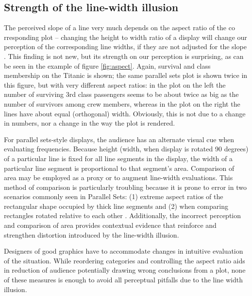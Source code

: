 \subsection{Strength of the line-width illusion}\label{distortion}


The perceived slope of a line very much depends on the aspect ratio of the co
rresponding plot -- changing the height to width ratio of a display  will change our perception of the corresponding line widths, if they are not adjusted for the slope \cite{cleveland:1984}. This finding is not new, but its strength on our perception is surprising, as can be seen in the example of  figure \ref{fig:aspect}.  Again, survival and class membership on the Titanic is shown; the same parallel sets plot is shown twice in this figure, but with very different aspect ratios: in the  plot on the left the number of surviving 3rd class passengers seems to be about twice as big as the number of survivors among crew members, whereas in the plot on the right the lines have about equal (orthogonal) width. Obviously, this is not due to a change in numbers, nor a change in the way the plot is rendered. 

For parallel sets-style displays, the audience has an alternate visual cue when evaluating frequencies. Because height (width, when display is rotated 90 degrees) of a particular line is fixed for all line segments in the display, the width of a particular line segment is proportional to that segment's area. Comparison of area may be employed as a proxy or to augment line-width evaluations. This method of comparison is particularly troubling because it is prone to error in two scenarios commonly seen in Parallel Sets: (1) extreme aspect ratios of the rectangular shape occupied by thick line segments and (2) when comparing rectangles rotated relative to each other \citep{heer:2010, kong:2010}. Additionally, the incorrect perception and comparison of area provides contextual evidence that reinforce and strengthen distortion introduced by the line-width illusion.


Designers of good graphics have to accommodate changes in intuitive evaluation of the situation. While reordering categories and controlling the aspect ratio aids in reduction of audience potentially drawing wrong conclusions from a plot, none of these measures is enough to avoid all perceptual pitfalls due to the line width illusion.




%



